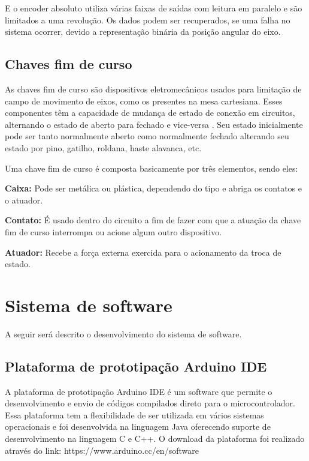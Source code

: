 E o encoder absoluto utiliza várias faixas de saídas com leitura em paralelo e são limitados a uma revolução. 
Os dados podem ser recuperados, se uma falha no sistema ocorrer, devido a representação binária da posição 
angular do eixo.

\subsection{Chaves fim de curso}\label{subsec:metchaves}

As chaves fim de curso são dispositivos eletromecânicos usados para limitação de campo de movimento de eixos, 
como os presentes na mesa cartesiana. Esses componentes têm a capacidade de mudança de estado de conexão 
em circuitos, alternando o estado de aberto para fechado e vice-versa \cite{alciatore2014introduccao}. 
Seu estado inicialmente pode ser tanto normalmente aberto como normalmente fechado alterando seu estado 
por pino, gatilho, roldana, haste alavanca, etc. 

Uma chave fim de curso é composta basicamente por três elementos, sendo eles:

\begin{alineas}
    \item \textbf{Caixa:} Pode ser metálica ou plástica, dependendo do tipo e abriga os contatos e o atuador.
    \item \textbf{Contato:} É usado dentro do circuito a fim de fazer com que a atuação da chave fim de curso interrompa ou 
    acione algum outro dispositivo.
    \item \textbf{Atuador:} Recebe a força externa exercida para o acionamento da troca de estado.
\end{alineas}

\section{Sistema de software}\label{sec:metsissof}

A seguir será descrito o desenvolvimento do sistema de software.

\subsection{Plataforma de prototipação Arduino IDE}\label{subsec:metide}

A plataforma de prototipação Arduino \ac{IDE} é um software que permite o desenvolvimento e envio 
de códigos compilados direto para o microcontrolador. Essa plataforma tem a flexibilidade de 
ser utilizada em vários sistemas operacionais e foi desenvolvida na linguagem Java oferecendo 
suporte de desenvolvimento na linguagem C e C++. O download da plataforma foi realizado 
através do link: https://www.arduino.cc/en/software

